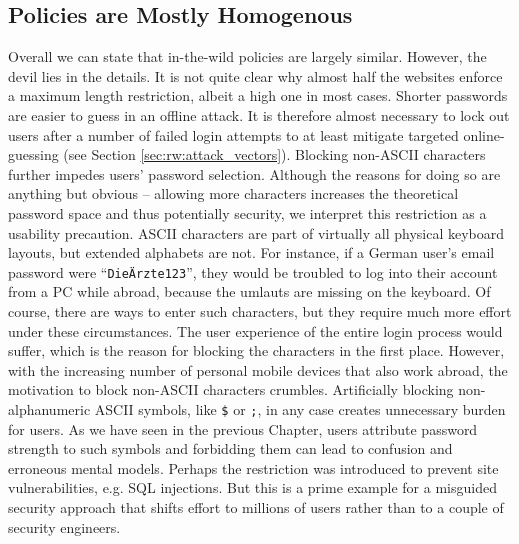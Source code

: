 \subsection{Policies are Mostly Homogenous}
Overall we can state that in-the-wild policies are largely similar. However, the devil lies in the details. It is not quite clear why almost half the websites enforce a maximum length restriction, albeit a high one in most cases. Shorter passwords are easier to guess in an offline attack. It is therefore almost necessary to lock out users after a number of failed login attempts to at least mitigate targeted online-guessing (see Section \ref{sec:rw:attack_vectors}). Blocking non-ASCII characters further impedes users' password selection. Although the reasons for doing so are anything but obvious -- allowing more characters increases the theoretical password space and thus potentially security, we interpret this restriction as a usability precaution. ASCII characters are part of virtually all physical keyboard layouts, but extended alphabets are not. For instance, if a German user's email password were ``\texttt{DieÄrzte123}'', they would be troubled to log into their account from a PC while abroad, because the umlauts are missing on the keyboard. Of course, there are ways to enter such characters, but they require much more effort under these circumstances. The user experience of the entire login process would suffer, which is the reason for blocking the characters in the first place. However, with the increasing number of personal mobile devices that also work abroad, the motivation to block non-ASCII characters crumbles. Artificially blocking non-alphanumeric ASCII symbols, like \texttt{\$} or \texttt{;}, in any case creates unnecessary burden for users. As we have seen in the previous Chapter, users attribute password strength to such symbols and forbidding them can lead to confusion and erroneous mental models. Perhaps the restriction was introduced to prevent site vulnerabilities, e.g. SQL injections. But this is a prime example for a misguided security approach that shifts effort to millions of users rather than to a couple of security engineers. 

